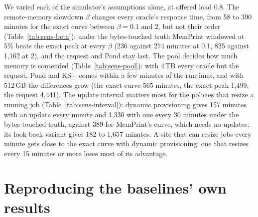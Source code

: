 \documentclass[11pt]{article}
\newcommand{\memprint}{MemPrint}
\newcommand{\tabref}[1]{Table~\ref{#1}}
\begin{document}
We varied each of the simulator's assumptions alone, at offered load 0.8. The remote-memory slowdown $\beta$ changes
every oracle's response time, from 58 to 390 minutes for the exact curve between $\beta = 0.1$ and 2, but not their
order (\tabref{tab:sens-beta}): under the bytes-touched truth \memprint{} windowed at 5\% beats the exact peak at every
$\beta$ (236 against 274 minutes at 0.1, 825 against 1{,}162 at 2), and the request and Pond stay last. The pool decides
how much memory is contended (\tabref{tab:sens-pool}): with 4\,TB every oracle but the request, Pond and KS+ comes within
a few minutes of the runtimes, and with 512\,GB the differences grow (the exact curve 565 minutes, the exact peak
1{,}499, the request 4{,}441). The update interval matters most for the policies that resize a running job
(\tabref{tab:sens-interval}): dynamic provisioning gives 157 minutes with an update every minute and 1{,}330 with one
every 30 minutes under the bytes-touched truth, against 389 for \memprint{}'s curve, which needs no updates; its
look-back variant gives 182 to 1{,}657 minutes. A site that can resize jobs every minute gets close to the exact
curve with dynamic provisioning; one that resizes every 15 minutes or more loses most of its advantage.

\section{Reproducing the baselines' own results}
\label{sec:repro}

\begin{table}[p]
\centering
\caption{KS+'s memory wastage against its baselines, as the KS+ paper's Figure 6 reports it and as the authors' code
(dos-group/KSPlus) gives it on their traces (dos-group/k-Segments-traces): the reduction, in percent, of KS+'s
wastage summed over each workflow's tasks (mean of 10 seeds) for 25, 50 and 75\% training data.}
\label{tab:repro-ksplus}

\end{table}

\begin{table}[p]
\centering
\caption{DRAM saved by pooling a fixed share of every virtual machine's memory, in percent, against the pool size in
CPU sockets, from the public Azure packing trace, mean of 10 clusters of tenants, with each server provisioned for its
own peak or every server for the cluster's largest peak; and Pond's Figure 3 at a 50\% share.}
\label{tab:repro-pond}

\end{table}
\end{document}
